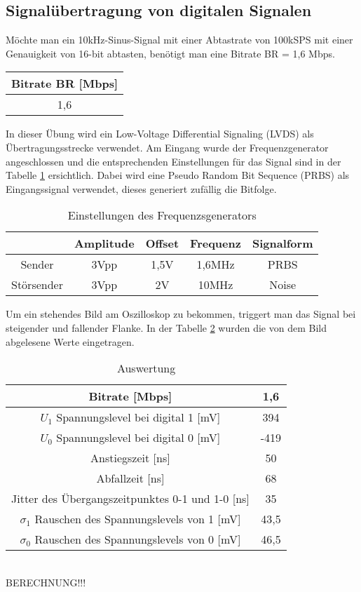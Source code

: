 \subsection{Signalübertragung von digitalen Signalen}

Möchte man ein 10kHz-Sinus-Signal mit einer Abtastrate von 100kSPS mit einer Genauigkeit von 16-bit abtasten, benötigt man eine Bitrate BR = 1,6 Mbps.

\begin{table}[!h]
	\centering
	\begin{tabular}{|c|}
		\hline 
		Bitrate BR [Mbps]		\\ 
		\hline 
		1,6		\\ 
		\hline 
	\end{tabular}
\end{table}

In dieser Übung wird ein Low-Voltage Differential Signaling (LVDS) als Übertragungsstrecke verwendet. Am Eingang wurde der Frequenzgenerator angeschlossen und die entsprechenden Einstellungen für das Signal sind in der Tabelle \ref{tb:einst_lvds} ersichtlich. Dabei wird eine Pseudo Random Bit Sequence (PRBS) als Eingangssignal verwendet, dieses generiert zufällig die Bitfolge.

\begin{table}[!h]
	\centering
	\begin{tabular}{|c|c|c|c|c|}
	\hline 
			& Amplitude		& Offset 	& Frequenz 		& Signalform		\\ 
	\hline 
	Sender	& 3Vpp		& 1,5V	& 1,6MHz		& PRBS		\\ 
	\hline 
	Störsender	& 3Vpp		& 2V		& 10MHz		& Noise 		\\ 
	\hline 
	\end{tabular}
	\caption{Einstellungen des Frequenzsgenerators}
	\label{tb:einst_lvds}
\end{table}

Um ein stehendes Bild am Oszilloskop zu bekommen, triggert man das Signal bei steigender und fallender Flanke. In der Tabelle \ref{tb:auswertung_lvds} wurden die von dem Bild abgelesene Werte eingetragen.

\begin{table}[!h]
	\centering
	\begin{tabular}{|c|c|}
	\hline 
	Bitrate [Mbps]							& 1,6		\\ 
	\hline 
	$U_1$ Spannungslevel bei digital 1 [mV]				& 394		\\ 
	\hline 
	$U_0$ Spannungslevel bei digital 0 [mV]				& -419	\\ 
	\hline 
	Anstiegszeit [ns]							& 50		\\ 
	\hline 
	Abfallzeit [ns]							& 68		\\ 
	\hline 
	Jitter des Übergangszeitpunktes 0-1 und 1-0 [ns]		& 35		\\ 
	\hline 
	$\sigma_1$ Rauschen des Spannungslevels von 1 [mV]	& 43,5	\\ 
	\hline 
	$\sigma_0$ Rauschen des Spannungslevels von 0 [mV]	& 46,5	\\ 
	\hline 
	\end{tabular}
	\caption{Auswertung}
	\label{tb:auswertung_lvds}
\end{table}
~\\
BERECHNUNG!!!

